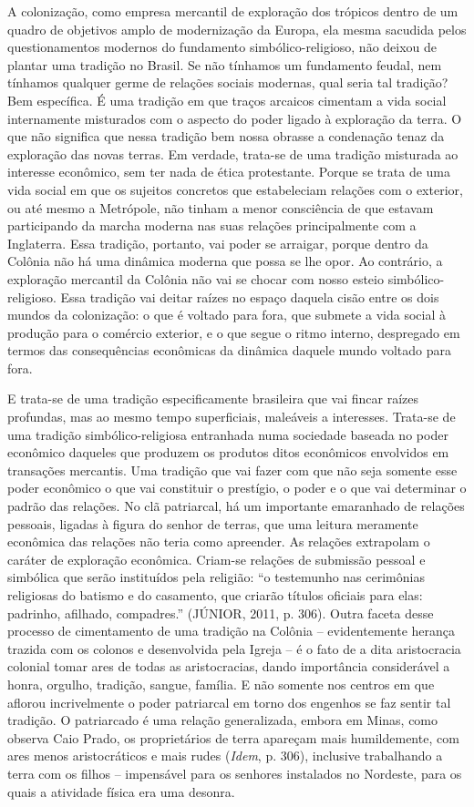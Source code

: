 A colonização, como empresa mercantil de exploração dos trópicos dentro
de um quadro de objetivos amplo de modernização da Europa, ela mesma
sacudida pelos questionamentos modernos do fundamento
simbólico-religioso, não deixou de plantar uma tradição no Brasil. Se
não tínhamos um fundamento feudal, nem tínhamos qualquer germe de
relações sociais modernas, qual seria tal tradição? Bem específica. É
uma tradição em que traços arcaicos cimentam a vida social internamente
misturados com o aspecto do poder ligado à exploração da terra. O que
não significa que nessa tradição bem nossa obrasse a condenação tenaz da
exploração das novas terras. Em verdade, trata-se de uma tradição
misturada ao interesse econômico, sem ter nada de ética protestante.
Porque se trata de uma vida social em que os sujeitos concretos que
estabeleciam relações com o exterior, ou até mesmo a Metrópole, não
tinham a menor consciência de que estavam participando da marcha moderna
nas suas relações principalmente com a Inglaterra. Essa tradição,
portanto, vai poder se arraigar, porque dentro da Colônia não há uma
dinâmica moderna que possa se lhe opor. Ao contrário, a exploração
mercantil da Colônia não vai se chocar com nosso esteio
simbólico-religioso. Essa tradição vai deitar raízes no espaço daquela
cisão entre os dois mundos da colonização: o que é voltado para fora,
que submete a vida social à produção para o comércio exterior, e o que
segue o ritmo interno, despregado em termos das consequências econômicas
da dinâmica daquele mundo voltado para fora.

E trata-se de uma tradição especificamente brasileira que vai fincar
raízes profundas, mas ao mesmo tempo superficiais, maleáveis a
interesses. Trata-se de uma tradição simbólico-religiosa entranhada numa
sociedade baseada no poder econômico daqueles que produzem os produtos
ditos econômicos envolvidos em transações mercantis. Uma tradição que
vai fazer com que não seja somente esse poder econômico o que vai
constituir o prestígio, o poder e o que vai determinar o padrão das
relações. No clã patriarcal, há um importante emaranhado de relações
pessoais, ligadas à figura do senhor de terras, que uma leitura
meramente econômica das relações não teria como apreender. As relações
extrapolam o caráter de exploração econômica. Criam-se relações de
submissão pessoal e simbólica que serão instituídos pela religião: ``o
testemunho nas cerimônias religiosas do batismo e do casamento, que
criarão títulos oficiais para elas: padrinho, afilhado, compadres.''
(JÚNIOR, 2011, p. 306). Outra faceta desse processo de cimentamento de
uma tradição na Colônia -- evidentemente herança trazida com os colonos
e desenvolvida pela Igreja -- é o fato de a dita aristocracia colonial
tomar ares de todas as aristocracias, dando importância considerável a
honra, orgulho, tradição, sangue, família. E não somente nos centros em
que aflorou incrivelmente o poder patriarcal em torno dos engenhos se
faz sentir tal tradição. O patriarcado é uma relação generalizada,
embora em Minas, como observa Caio Prado, os proprietários de terra
apareçam mais humildemente, com ares menos aristocráticos e mais rudes
(\emph{Idem}, p. 306), inclusive trabalhando a terra com os filhos --
impensável para os senhores instalados no Nordeste, para os quais a
atividade física era uma desonra.

